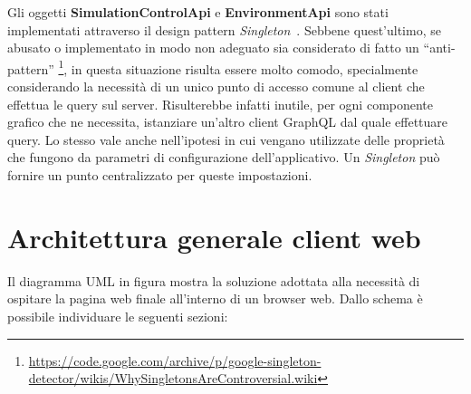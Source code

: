 Gli oggetti \textbf{SimulationControlApi} e \textbf{EnvironmentApi} sono stati implementati attraverso il design pattern \textit{Singleton}~\cite{Gamma1994}. Sebbene quest'ultimo, se abusato o implementato in modo non adeguato sia considerato di fatto un ``anti-pattern'' \footnote{\url{https://code.google.com/archive/p/google-singleton-detector/wikis/WhySingletonsAreControversial.wiki}}, in questa situazione risulta essere molto comodo, specialmente considerando la necessità di un unico punto di accesso comune al client che effettua le query sul server. Risulterebbe infatti inutile, per ogni componente grafico che ne necessita, istanziare un'altro client GraphQL dal quale effettuare query. Lo stesso vale anche nell'ipotesi in cui vengano utilizzate delle proprietà che fungono da parametri di configurazione dell'applicativo. Un \textit{Singleton} può fornire un punto centralizzato per queste impostazioni.

\section{Architettura generale client web}
Il diagramma UML in figura mostra la soluzione adottata alla necessità di ospitare la pagina web finale all'interno di un browser web. Dallo schema è possibile individuare le seguenti sezioni:

